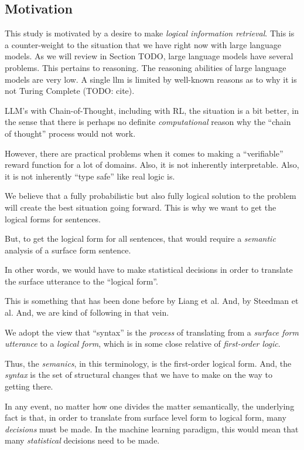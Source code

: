 \label{sec:contributions}

\subsection{Motivation}
This study is motivated by a desire to make {\em logical information retrieval}.
This is a counter-weight to the situation that we have right now with large language models.
As we will review in Section TODO, large language models have several problems.
This pertains to reasoning.
The reasoning abilities of large language models are very low.
A single llm is limited by well-known reasons as to why it is not Turing Complete (TODO: cite).

LLM's with Chain-of-Thought, including with RL, the situation is a bit better, in the sense that there is perhaps no definite {\em computational} reason why the ``chain of thought'' process would not work.

However, there are practical problems when it comes to making a ``verifiable'' reward function for a lot of domains.
Also, it is not inherently interpretable.
Also, it is not inherently ``type safe'' like real logic is.

We believe that a fully probabilistic but also fully logical solution to the problem will create the best situation going forward.
This is why we want to get the logical forms for sentences.

But, to get the logical form for all sentences, that would require a {\em semantic} analysis of a surface form sentence.

In other words, we would have to make statistical decisions in order to translate the surface utterance to the ``logical form''.

This is something that has been done before by Liang et al.
And, by Steedman et al.
And, we are kind of following in that vein.

We adopt the view that ``syntax'' is the {\em process} of translating from a {\em surface form utterance} to a {\em logical form}, which is in some close relative of {\em first-order logic}.

Thus, the {\em semanics}, in this terminology, is the first-order logical form.
And, the {\em syntax} is the set of structural changes that we have to make on the way to getting there.

In any event, no matter how one divides the matter semantically, the underlying fact is that, in order to translate from surface level form to logical form, many {\em decisions} must be made.
In the machine learning paradigm, this would mean that many {\em statistical} decisions need to be made.

